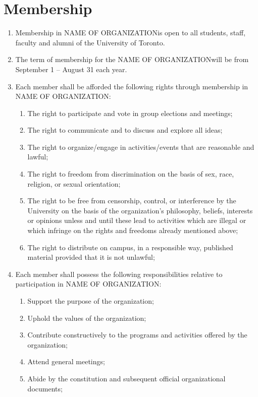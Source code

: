 \documentclass[12pt]{article}
\newcommand{\orgname}{NAME OF ORGANIZATION\space}
\begin{document}
\section{Membership}
\begin{enumerate}[{3}.1]
    \item Membership in \orgname is open to all students, staff, faculty and alumni of the University of Toronto.
    \item The term of membership for the \orgname will be from September 1 – August 31 each year.
    \item Each member shall be afforded the following rights through membership in \orgname: 
    \begin{enumerate}[{3.3}.1]
        \item	The right to participate and vote in group elections and meetings;
        \item	The right to communicate and to discuss and explore all ideas;
        \item	The right to organize/engage in activities/events that are reasonable and lawful;
        \item	The right to freedom from discrimination on the basis of sex, race, religion, or sexual orientation;
        \item	The right to be free from censorship, control, or interference by the University on the basis of the organization’s philosophy, beliefs, interests or opinions unless and until these lead to activities which are illegal or which infringe on the rights and freedoms already mentioned above;
        \item	The right to distribute on campus, in a responsible way, published material provided that it is not unlawful;
    \end{enumerate}
    \item Each member shall possess the following responsibilities relative to participation in \orgname: 
    \begin{enumerate}[{3.4}.1]
        \item	Support the purpose of the organization; 
        \item	Uphold the values of the organization;
        \item	Contribute constructively to the programs and activities offered by the organization; 
        \item	Attend general meetings; 
        \item	Abide by the constitution and subsequent official organizational documents;

\end{enumerate}
\end{enumerate}
\end{document}

